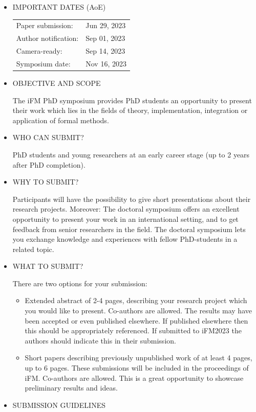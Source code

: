 \documentclass[prodmode,acmtecs]{acmsmall} %
\begin{document}
\begin{itemize}\item  IMPORTANT DATES (AoE) 
 
\begin{tabulary}{\linewidth}{LL}Paper submission:  & Jun 29, 2023 \\
Author notification:  & Sep 01, 2023 \\
Camera-ready:  & Sep 14, 2023 \\
Symposium date:  & Nov 16, 2023 \\
\end{tabulary}
 
\item  OBJECTIVE AND SCOPE 
 
  The iFM PhD symposium provides PhD students an opportunity to present their work which lies in the fields of theory, implementation, integration or application of formal methods. 
 
\item  WHO CAN SUBMIT? 
 
  PhD students and young researchers at an early career stage (up to 2 years after PhD completion). 
 
\item  WHY TO SUBMIT?  
 
  Participants will have the possibility to give short presentations about their research projects. Moreover: The doctoral symposium offers an excellent opportunity to present your work in an international setting, and to get feedback from senior researchers in the field. The doctoral symposium lets you exchange knowledge and experiences with fellow PhD-students in a related topic. 
 
\item  WHAT TO SUBMIT?  
 
  There are two options for your submission:  
 
\begin{itemize}\item  Extended abstract of 2-4 pages, describing your research project which you would like to present. Co-authors are allowed. The results may have been accepted or even published elsewhere. If published elsewhere then this should be appropriately referenced. If submitted to iFM2023 the authors should indicate this in their submission.
\item  Short papers describing previously unpublished work of at least 4 pages, up to 6 pages. These submissions will be included in the proceedings of iFM. Co-authors are allowed. This is a great opportunity to showcase preliminary results and ideas.
\end{itemize} 
\item  SUBMISSION GUIDELINES 
 

\end{itemize}
\end{document}

